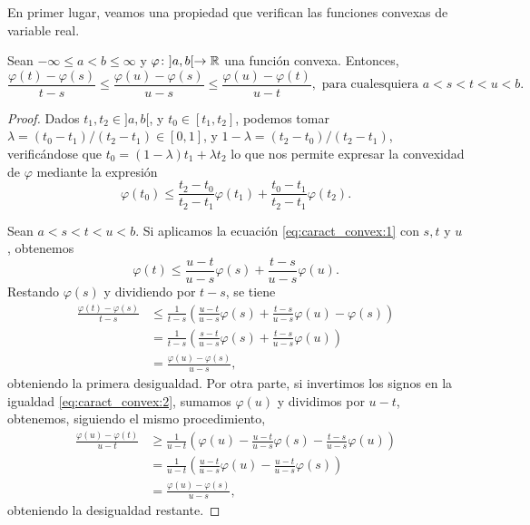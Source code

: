 En primer lugar, veamos una propiedad que verifican las funciones convexas de variable real.

\begin{lem} \label{lem:secantes}
    Sean $-\infty \le a < b \le \infty$ y $\varphi \colon ]a,b[ \to \mathbb{R}$ una función convexa. Entonces,
    \[ \frac{\varphi(t) - \varphi(s)}{t-s} \le \frac{\varphi(u)-\varphi(s)}{u - s} \le \frac{\varphi(u)-\varphi(t)}{u-t}, \text{ para cualesquiera } a < s < t < u < b.\]
\end{lem}

\begin{proof}
    Dados $t_1,t_2 \in ]a,b[$, y $t_0 \in [t_1,t_2]$, podemos tomar $\lambda = (t_0 - t_1)/(t_2 - t_1) \in [0,1]$, y $1- \lambda = (t_2 - t_0)/(t_2 - t_1)$, verificándose que $t_0 = (1 - \lambda)t_1 + \lambda t_2$ lo que nos permite expresar la convexidad de $\varphi$ mediante la expresión
    \begin{equation} \label{eq:caract_convex:1}
        \varphi(t_0) \le \frac{t_2 - t_0}{t_2 - t_1}\varphi(t_1)+\frac{t_0 - t_1}{t_2 - t_1}\varphi(t_2). 
    \end{equation}

    Sean $a < s < t < u < b$. Si aplicamos la ecuación \ref{eq:caract_convex:1} con $s,t$ y $u$, obtenemos
    \begin{equation} \label{eq:caract_convex:2}
        \varphi(t) \le \frac{u - t}{u-s}\varphi(s) + \frac{t-s}{u-s}\varphi(u).
    \end{equation}
    Restando $\varphi(s)$ y dividiendo por $t-s$, se tiene
    \begin{align*}
        \frac{\varphi(t)-\varphi(s)}{t-s} &\le  \frac{1}{t-s}\left(\frac{u - t}{u-s}\varphi(s) + \frac{t-s}{u-s}\varphi(u) - \varphi(s)\right) \\
                    &= \frac{1}{t-s}\left(\frac{s-t}{u-s}\varphi(s) + \frac{t-s}{u-s}\varphi(u) \right) \\
                    &= \frac{\varphi(u)-\varphi(s)}{u - s},
    \end{align*}
    obteniendo la primera desigualdad. Por otra parte, si invertimos los signos en la igualdad \ref{eq:caract_convex:2}, sumamos $\varphi(u)$ y dividimos por $u -t$, obtenemos, siguiendo el mismo procedimiento,
    \begin{align*}
        \frac{\varphi(u)-\varphi(t)}{u - t} &\ge \frac{1}{u-t}\left( \varphi(u) - \frac{u-t}{u-s}\varphi(s) - \frac{t-s}{u-s}\varphi(u)\right) \\
                &= \frac{1}{u-t}\left( \frac{u-t}{u-s}\varphi(u) - \frac{u-t}{u-s}\varphi(s) \right) \\
                &= \frac{\varphi(u) - \varphi(s)}{u-s},
    \end{align*}
    obteniendo la desigualdad restante.
\end{proof}


